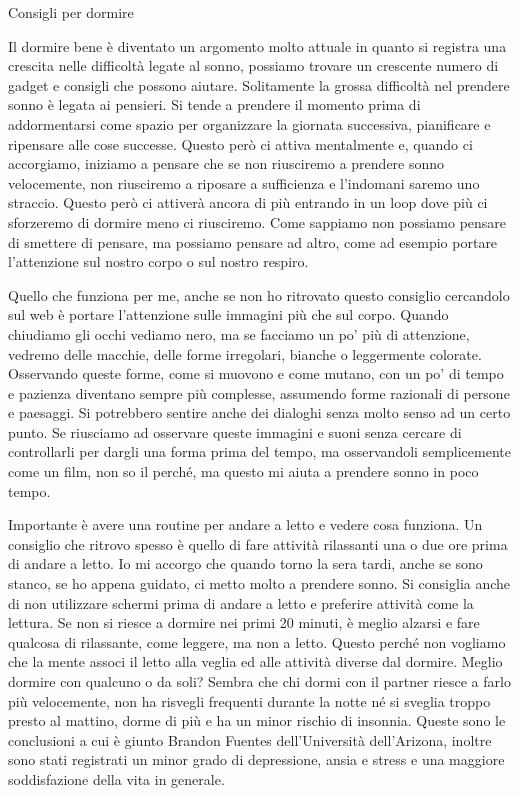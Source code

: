 \documentclass[12pt]{book} %
\begin{document}
\bigskip
\begin{mdframed}[linewidth=1pt]
Consigli per dormire

Il dormire bene è diventato un argomento molto attuale in quanto si registra una crescita nelle difficoltà legate al
sonno, possiamo trovare un crescente numero di gadget e consigli che possono aiutare. Solitamente la grossa difficoltà
nel prendere sonno è legata ai pensieri. Si tende a prendere il momento prima di addormentarsi come spazio per
organizzare la giornata successiva, pianificare e ripensare alle cose successe. Questo però ci attiva mentalmente e,
quando ci accorgiamo, iniziamo a pensare che se non riusciremo a prendere sonno velocemente, non riusciremo a riposare
a sufficienza e l'indomani saremo uno straccio. Questo però ci attiverà ancora di più entrando in
un loop dove più ci sforzeremo di dormire meno ci riusciremo. Come sappiamo non possiamo pensare di smettere di
pensare, ma possiamo pensare ad altro, come ad esempio portare l'attenzione sul nostro corpo o sul
nostro respiro. 

Quello che funziona per me, anche se non ho ritrovato questo consiglio cercandolo sul web è portare
l'attenzione sulle immagini più che sul corpo. Quando chiudiamo gli occhi vediamo nero, ma se
facciamo un po' più di attenzione, vedremo delle macchie, delle forme irregolari, bianche o
leggermente colorate. Osservando queste forme, come si muovono e come mutano, con un po' di tempo
e pazienza diventano sempre più complesse, assumendo forme razionali di persone e paesaggi. Si potrebbero sentire anche
dei dialoghi senza molto senso ad un certo punto. Se riusciamo ad osservare queste immagini e suoni senza cercare di
controllarli per dargli una forma prima del tempo, ma osservandoli semplicemente come un film, non so il perché, ma
questo mi aiuta a prendere sonno in poco tempo.

Importante è avere una routine per andare a letto e vedere cosa funziona. Un consiglio che ritrovo spesso è quello di
fare attività rilassanti una o due ore prima di andare a letto. Io mi accorgo che quando torno la sera tardi, anche se
sono stanco, se ho appena guidato, ci metto molto a prendere sonno. Si consiglia anche di non utilizzare schermi prima
di andare a letto e preferire attività come la lettura. Se non si riesce a dormire nei primi 20 minuti, è meglio
alzarsi e fare qualcosa di rilassante, come leggere, ma non a letto. Questo perché non vogliamo che la mente associ il
letto alla veglia ed alle attività diverse dal dormire. Meglio dormire con qualcuno o da soli? Sembra che chi dormi con
il partner riesce a farlo più velocemente, non ha risvegli frequenti durante la notte né si sveglia troppo presto al
mattino, dorme di più e ha un minor rischio di insonnia. Queste sono le conclusioni a cui è giunto Brandon Fuentes
dell'Università dell'Arizona, inoltre sono stati registrati un minor grado di depressione, ansia e stress e una
maggiore soddisfazione della vita in generale. 



\end{mdframed}
\end{document}
